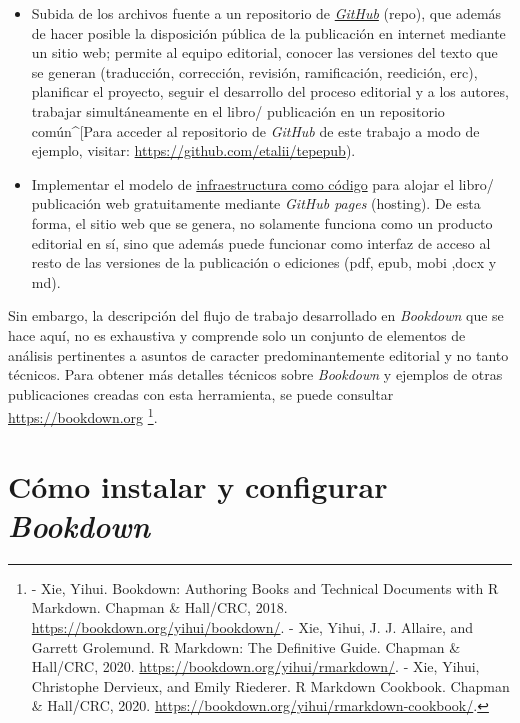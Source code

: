 \documentclass[
]{book}
\begin{document}
\begin{itemize}
\item
  Subida de los archivos fuente a un repositorio de \href{https://github.com/}{\emph{GitHub}} (repo), que además de hacer posible la disposición pública de la publicación en internet mediante un sitio web; permite al equipo editorial, conocer las versiones del texto que se generan (traducción, corrección, revisión, ramificación, reedición, erc), planificar el proyecto, seguir el desarrollo del proceso editorial y a los autores, trabajar simultáneamente en el libro/ publicación en un repositorio común\^{}{[}Para acceder al repositorio de \emph{GitHub} de este trabajo a modo de ejemplo, visitar: \url{https://github.com/etalii/tepepub}).
\item
  Implementar el modelo de \href{https://docs.microsoft.com/es-es/devops/deliver/what-is-infrastructure-as-code}{infraestructura como código} para alojar el libro/ publicación web gratuitamente mediante \emph{GitHub pages} (hosting). De esta forma, el sitio web que se genera, no solamente funciona como un producto editorial en sí, sino que además puede funcionar como interfaz de acceso al resto de las versiones de la publicación o ediciones (pdf, epub, mobi ,docx y md).
\end{itemize}

Sin embargo, la descripción del flujo de trabajo desarrollado en \emph{Bookdown} que se hace aquí, no es exhaustiva y comprende solo un conjunto de elementos de análisis pertinentes a asuntos de caracter predominantemente editorial y no tanto técnicos. Para obtener más detalles técnicos sobre \emph{Bookdown} y ejemplos de otras publicaciones creadas con esta herramienta, se puede consultar \url{https://bookdown.org} \footnote{- Xie, Yihui. Bookdown: Authoring Books and Technical Documents with R Markdown. Chapman \& Hall/CRC, 2018. \url{https://bookdown.org/yihui/bookdown/}. - Xie, Yihui, J. J. Allaire, and Garrett Grolemund. R Markdown: The Definitive Guide. Chapman \& Hall/CRC, 2020. \url{https://bookdown.org/yihui/rmarkdown/}. - Xie, Yihui, Christophe Dervieux, and Emily Riederer. R Markdown Cookbook. Chapman \& Hall/CRC, 2020. \url{https://bookdown.org/yihui/rmarkdown-cookbook/}.}.

\hypertarget{cuxf3mo-instalar-y-configurar-bookdown}{%
\section{\texorpdfstring{Cómo instalar y configurar \emph{Bookdown}}{Cómo instalar y configurar Bookdown}}\label{cuxf3mo-instalar-y-configurar-bookdown}}
\end{document}
